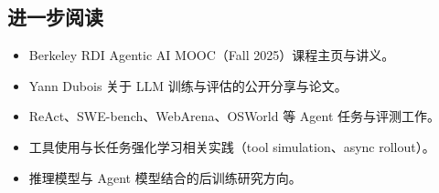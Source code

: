 \subsection{进一步阅读}
\begin{itemize}
    \item Berkeley RDI Agentic AI MOOC（Fall 2025）课程主页与讲义。
    \item Yann Dubois 关于 LLM 训练与评估的公开分享与论文。
    \item ReAct、SWE-bench、WebArena、OSWorld 等 Agent 任务与评测工作。
    \item 工具使用与长任务强化学习相关实践（tool simulation、async rollout）。
    \item 推理模型与 Agent 模型结合的后训练研究方向。
\end{itemize}


